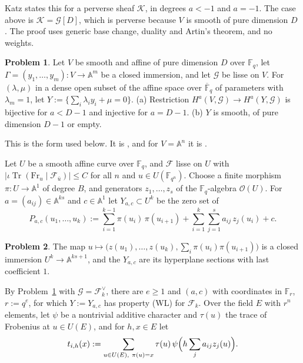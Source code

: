 \documentclass[reqno]{amsart}
\theoremstyle{definition}
\newtheorem{problem}{Problem}[section]
\theoremstyle{plain}
\newcommand{\F}{\mathbb{F}}
\newcommand{\A}{\mathbb{A}}
\newcommand{\Fb}{\overline{\F}_q}
\newcommand{\cF}{\mathcal{F}}
\newcommand{\cG}{\mathcal{G}}
\newcommand{\Fr}{\mathrm{Fr}}
\newcommand{\Tr}{\operatorname{Tr}}
\begin{document}
Katz states this for a perverse sheaf \(\mathcal{K}\), in degrees \(a < -1\) and \(a = -1\).  The case above is \(\mathcal{K} = \cG[D]\), which is perverse because \(V\) is smooth of pure dimension \(D\) \cite[proof of Corollary~3.4.1]{Kat93}.  The proof uses generic base change, duality and Artin's theorem, and no weights.

\begin{problem}\label{pr:wl-affine}
Let \(V\) be smooth and affine of pure dimension \(D\) over \(\F_q\), let \(\Gamma = (y_1, \dots, y_m) \colon V \to \A^m\) be a closed immersion, and let \(\cG\) be lisse on \(V\).  For \((\lambda, \mu)\) in a dense open subset of the affine space over \(\Fb\) of parameters with \(\lambda_m = 1\), let \(Y := \{\sum_i \lambda_i y_i + \mu = 0\}\).
(a) Restriction \(H^a(V, \cG) \to H^a(Y, \cG)\) is bijective for \(a < D - 1\) and injective for \(a = D - 1\).
(b) \(Y\) is smooth, of pure dimension \(D - 1\) or empty.
\end{problem}

This is the form used below.  It is \cite[Lemma~8]{Ald}, and for \(V = \A^n\) it is \cite[Theorem~2.4 and Construction~2.5]{Zh}.

Let \(U\) be a smooth affine curve over \(\F_q\), and \(\cF\) lisse on \(U\) with \(\lvert \iota \Tr(\Fr_u \mid \cF_{\bar u}) \rvert \le C\) for all \(n\) and \(u \in U(\F_{q^n})\).  Choose a finite morphism \(\pi \colon U \to \A^1\) of degree \(B\), and generators \(z_1, \dots, z_s\) of the \(\F_q\)-algebra \(\mathcal{O}(U)\).  For \(a = (a_{ij}) \in \A^{ks}\) and \(c \in \A^1\) let \(Y_{a,c} \subset U^k\) be the zero set of
\[
  P_{a,c}(u_1, \dots, u_k) := \sum_{i=1}^{k-1} \pi(u_i)\,\pi(u_{i+1}) + \sum_{i=1}^{k} \sum_{j=1}^{s} a_{ij}\, z_j(u_i) + c .
\]

\begin{problem}\label{pr:Gamma}
The map \(u \mapsto \bigl(z(u_1), \dots, z(u_k), \sum_i \pi(u_i)\pi(u_{i+1})\bigr)\) is a closed immersion \(U^k \to \A^{ks+1}\), and the \(Y_{a,c}\) are its hyperplane sections with last coefficient \(1\).
\end{problem}

By Problem~\ref{pr:wl-affine} with \(\cG = \cF_k^\vee\), there are \(e \ge 1\) and \((a, c)\) with coordinates in \(\F_r\), \(r := q^e\), for which \(Y := Y_{a,c}\) has property (WL) for \(\cF_k\).  Over the field \(E\) with \(r^n\) elements, let \(\psi\) be a nontrivial additive character and \(\tau(u)\) the trace of Frobenius at \(u \in U(E)\), and for \(h, x \in E\) let
\[
  t_{i,h}(x) := \sum_{u \in U(E),\ \pi(u) = x} \tau(u)\, \psi\Bigl(h \sum_j a_{ij} z_j(u)\Bigr).
\]
\end{document}

